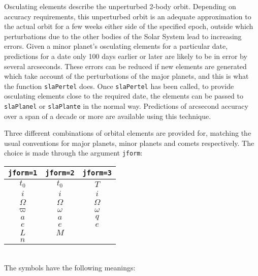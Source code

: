 \documentclass[11pt,fleqn,twoside]{article}
\renewcommand{\_}{{\tt\char'137}}     %
\begin{document}
Osculating elements describe the unperturbed 2-body orbit.  Depending
on accuracy requirements, this unperturbed orbit is an
adequate approximation to the actual orbit for a few weeks either
side of the specified epoch, outside which perturbations due to
the other bodies of the Solar System lead to
increasing errors.  Given a minor planet's osculating elements for
a particular date, predictions for a date only
100 days earlier or later
are likely to be in error by several arcseconds.
These errors can
be reduced if new elements are generated which take account of
the perturbations of the major planets, and this is what the function
{\tt slaPertel} does.  Once
{\tt slaPertel} has been called, to provide osculating elements
close to the required date, the elements can be passed to
{\tt slaPlanel} or
{\tt slaPlante} in the normal way.  Predictions of arcsecond accuracy
over a span of a decade or more are available using this
technique.

Three different combinations of orbital elements are
provided for, matching the usual conventions
for major planets, minor planets and
comets respectively.  The choice is made through the
argument {\tt jform}:
 
\vspace{1ex}
\hspace{3em}
\begin{tabular}{|c|c|c|} \hline
{\tt jform=1} & {\tt jform=2} & {\tt jform=3} \\
\hline \hline
$t_0$ & $t_0$ & $T$ \\
\hline
$i$ & $i$ & $i$ \\
\hline
$\Omega$ & $\Omega$ & $\Omega$ \\
\hline
$\varpi$ & $\omega$ & $\omega$ \\
\hline
$a$ & $a$ & $q$ \\
\hline
$e$ & $e$ & $e$ \\
\hline
$L$ & $M$ & \\
\hline
$n$ & & \\
\hline
\end{tabular}\\[2ex]
The symbols have the following meanings:
 
\end{document}
